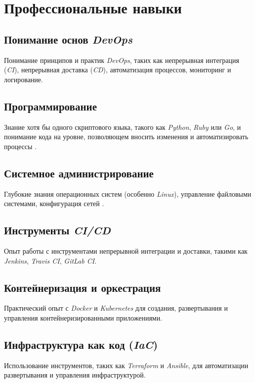 \documentclass[variant=practice]{bsuir}
\begin{document}

\section{Профессиональные навыки}

\subsection{Понимание основ \textit{DevOps}} Понимание принципов и практик
\textit{DevOps}, таких как непрерывная интеграция (\textit{CI}), непрерывная
доставка (\textit{CD}), автоматизация процессов, мониторинг и логирование.

\subsection{Программирование} Знание хотя бы одного скриптового языка, такого
как \textit{Python}, \textit{Ruby} или \textit{Go}, и понимание кода на
уровне, позволяющем вносить изменения и автоматизировать процессы
\cite{devops-mts}.

\subsection{Системное администрирование} Глубокие знания операционных систем
(особенно \textit{Linux}), управление файловыми системами, конфигурация сетей
\cite{devops-mts}.

\subsection{Инструменты \textit{CI/CD}} Опыт работы с инструментами непрерывной
интеграции и доставки, такими как \textit{Jenkins}, \textit{Travis CI},
\textit{GitLab CI}.

\subsection{Контейнеризация и оркестрация} Практический опыт с \textit{Docker} и
\textit{Kubernetes} для создания, развертывания и управления
контейнеризированными приложениями.

\subsection{Инфраструктура как код (\textit{IaC})} Использование инструментов,
таких как \textit{Terraform} и \textit{Ansible}, для автоматизации развертывания
и управления инфраструктурой.
\end{document}
